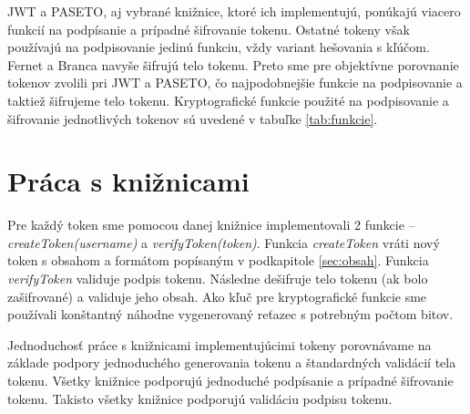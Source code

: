 JWT a PASETO, aj vybrané knižnice, ktoré ich implementujú, ponúkajú viacero funkcií na podpísanie a prípadné šifrovanie tokenu. Ostatné tokeny však používajú na podpisovanie jedinú funkciu, vždy variant hešovania s kľúčom. Fernet a Branca navyše šifrujú telo tokenu. Preto sme pre objektívne porovnanie tokenov zvolili pri JWT a PASETO, čo najpodobnejšie funkcie na podpisovanie a taktiež šifrujeme telo tokenu. Kryptografické funkcie použité na podpisovanie a šifrovanie jednotlivých tokenov sú uvedené v tabuľke \ref{tab:funkcie}.

\begin{table}
  \begin{center}
    \caption{Kryptografické funkcie na podpisovanie a šifrovanie tokenov}
    \label{tab:funkcie} %

  \end{center}
\end{table}

\section{Práca s knižnicami}

Pre každý token sme pomocou danej knižnice implementovali 2 funkcie -- \textit{createToken(username)} a \textit{verifyToken(token)}. Funkcia \textit{createToken} vráti nový token s obsahom a formátom popísaným v podkapitole \ref{sec:obsah}. Funkcia \textit{verifyToken} validuje podpis tokenu. Následne dešifruje telo tokenu (ak bolo zašifrované) a validuje jeho obsah. Ako kľuč pre kryptografické funkcie sme používali konštantný náhodne vygenerovaný reťazec s potrebným počtom bitov.

Jednoduchosť práce s knižnicami implementujúcimi tokeny porovnávame na základe podpory jednoduchého generovania tokenu a štandardných validácií tela tokenu.
Všetky knižnice podporujú jednoduché podpísanie a prípadné šifrovanie tokenu. Takisto všetky knižnice podporujú validáciu podpisu tokenu. 

